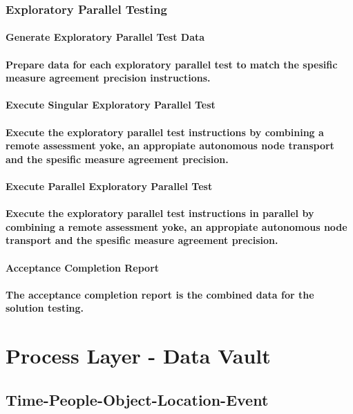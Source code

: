 \documentclass{acm_proc_article-sp}
\begin{document}
\subsubsection{Exploratory Parallel Testing}
\paragraph{Generate Exploratory Parallel Test Data}
\paragraph{Prepare data for each exploratory parallel test to match the spesific measure agreement precision instructions.}
\paragraph{Execute Singular Exploratory Parallel Test}
\paragraph{Execute the exploratory parallel test instructions by combining a remote assessment yoke, an appropiate autonomous node transport and the spesific measure agreement precision.}
\paragraph{Execute Parallel Exploratory Parallel Test}
\paragraph{Execute the exploratory parallel test instructions in parallel by combining a remote assessment yoke, an appropiate autonomous node transport and the spesific measure agreement precision.}
\paragraph{Acceptance Completion Report}
\paragraph{The acceptance completion report is the combined data for the solution testing.}
\newpage
\section{Process Layer - Data Vault}
\subsection{Time-People-Object-Location-Event}
\end{document}
